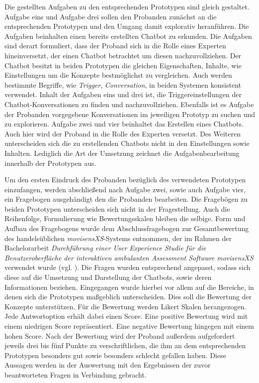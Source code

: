 Die gestellten Aufgaben zu den entsprechenden Prototypen sind gleich gestaltet. Aufgabe eins und Aufgabe drei sollen den Probanden zunächst an die entsprechenden Prototypen und den Umgang damit explorativ heranführen. Die Aufgaben beinhalten einen bereits erstellten Chatbot zu erkunden. Die Aufgaben sind derart formuliert, dass der Proband sich in die Rolle eines Experten hineinversetzt, der einen Chatbot betrachtet um diesen nachzuvollziehen. Der Chatbot besitzt in beiden Prototypen die gleichen Eigenschaften, Inhalte, wie Einstellungen um die Konzepte bestmöglichst zu vergleichen. Auch werden bestimmte Begriffe, wie \emph{Trigger}, \emph{Conversation}, in beiden Systemen konsistent verwendet. Inhalt der Aufgaben eins und drei ist, die Triggereinstellungen der Chatbot-Konversationen zu finden und nachzuvollziehen. Ebenfalls ist es Aufgabe der Probanden vorgegebene Konversationen im jeweiligen Prototyp zu suchen und zu explorieren. Aufgabe zwei und vier beinhaltet das Erstellen eines Chatbots. Auch hier wird der Proband in die Rolle des Experten versetzt. Des Weiteren unterscheiden sich die zu erstellenden Chatbots nicht in den Einstellungen sowie Inhalten. Lediglich die Art der Umsetzung zeichnet die Aufgabenbearbeitung innerhalb der Prototypen aus. 

Um den ersten Eindruck des Probanden bezüglich des verwendeten Prototypen einzufangen, werden abschließend nach Aufgabe zwei, sowie auch Aufgabe vier, ein Fragebogen ausgehändigt den die Probanden bearbeiten. Die Fragebögen zu beiden Prototypen unterscheiden sich nicht in der Fragestellung. Auch die Reihenfolge, Formulierung wie Bewertungsskalen bleiben die selbige. Form und Aufbau des Fragebogens wurde dem Abschlussfragebogen zur Gesamtbewertung des handelsüblichen \emph{movisensXS}-Systems entnommen, der im Rahmen der Bachelorarbeit \emph{Durchführung einer User Experience Studie für die Benutzeroberfläche der interaktiven ambulanten Assessment Software movisensXS} verwendet wurde (vgl. \cite{lindabrandl}). Die Fragen wurden entsprechend angepasst, sodass sich diese auf die Umsetzung und Darstellung der Chatbots, sowie deren Informationen beziehen. Eingegangen wurde hierbei vor allem auf die Bereiche, in denen sich die Prototypen maßgeblich unterscheiden. Dies soll die Bewertung der Konzepte unterstützen. Für die Bewertung werden Likert Skalen herangezogen. Jede Antwortoption erhält dabei einen Score. Eine positive Bewertung wird mit einem niedrigen Score repräsentiert. Eine negative Bewertung hingegen mit einem hohen Score. Nach der Bewertung wird der Proband außerdem aufgefordert jeweils drei bis fünf Punkte zu verschriftlichen, die ihm an dem entsprechenden Prototypen besonders gut sowie besonders schlecht gefallen haben. Diese Aussagen werden in der Auswertung mit den Ergebnissen der zuvor beantworteten Fragen in Verbindung gebracht.


